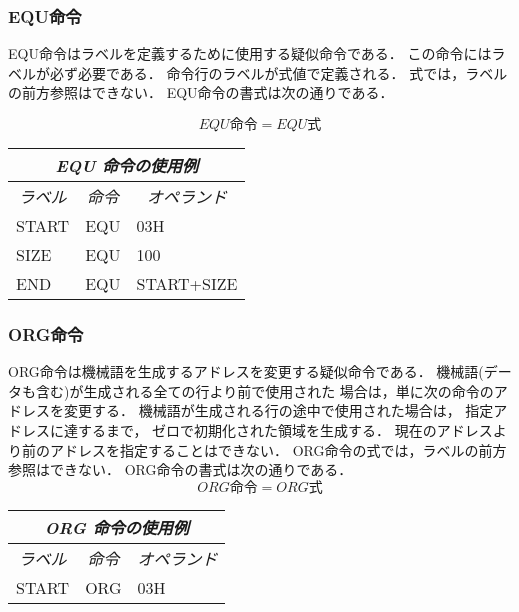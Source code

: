 \subsubsection{EQU命令}
EQU命令はラベルを定義するために使用する疑似命令である．
この命令にはラベルが必ず必要である．
命令行のラベルが式値で定義される．
式では，ラベルの前方参照はできない．
EQU命令の書式は次の通りである．

\[ EQU命令 = EQU　式 \]

\begin{center}
\tt\begin{tabular}{lll}
\hline
\multicolumn{3}{c}{\it EQU 命令の使用例} \\
\hline
\multicolumn{1}{c}{\it ラベル} & 
        \multicolumn{1}{c}{\it 命令} & \multicolumn{1}{c}{\it オペランド} \\
START & EQU & 03H \\
SIZE  & EQU & 100 \\
END   & EQU & START+SIZE \\
\hline
\end{tabular}
\end{center}
\vspace{0.2cm}

\subsubsection{ORG命令}
ORG命令は機械語を生成するアドレスを変更する疑似命令である．
機械語(データも含む)が生成される全ての行より前で使用された
場合は，単に次の命令のアドレスを変更する．
機械語が生成される行の途中で使用された場合は，
指定アドレスに達するまで，
ゼロで初期化された領域を生成する．
現在のアドレスより前のアドレスを指定することはできない．
ORG命令の式では，ラベルの前方参照はできない．
ORG命令の書式は次の通りである．
\[ ORG命令 = ORG　式 \]
\begin{center}
\tt\begin{tabular}{lll}
\hline
\multicolumn{3}{c}{\it ORG 命令の使用例} \\
\hline
\multicolumn{1}{c}{\it ラベル} & 
        \multicolumn{1}{c}{\it 命令} & \multicolumn{1}{c}{\it オペランド} \\
START & ORG & 03H \\
\hline
\end{tabular}
\end{center}
\vspace{0.2cm}

